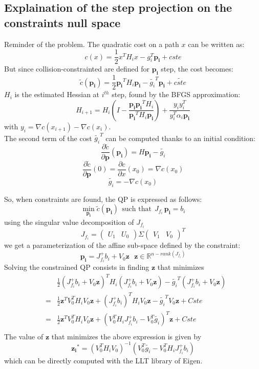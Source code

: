 \documentclass {article}
\newcommand\p{\mathbf{p_i}}
\newcommand\giT{\tilde{g_i}^T}
\newcommand\gi{\tilde{g_i}}
\newcommand\Jfi{J_{f_i}}
\newcommand\real{\mathbb{R}}
\begin{document}
\subsection{Explaination of the step projection on the constraints null space} 
\label{section:lagoLLTSection}
Reminder of the problem. 
The quadratic cost on a path $x$ can be written as:
$$
c(x) = \frac{1}{2}x^T H_i x - g_i^T\p + cste
$$
But since collision-constrainted are defined for $\p$ step, the cost becomes:
$$
\tilde{c}(\p)  = \frac{1}{2}\p^T H_i \p - \giT \p + \tilde{cste}
$$
$H_i$ is the estimated Hessian at $i^{th}$ step, found by the BFGS approximation:
$$ H_{i+1} = H_i(I - \frac{\p\p^T H_i}{\p^T H_i \p}) + \frac{y_i y_i^T}{y_i^T 
\alpha_i\p}$$
with $ y_i = \nabla c(x_{i+1}) - \nabla c(x_i) $.\\
The second term of the cost $ \giT $ can be computed thanks to an initial 
condition:
$$
\frac{\partial\tilde{c}}{\partial \mathbf{p}}(\p) = H\p-\gi
$$
$$
\frac{\partial\tilde{c}}{\partial \mathbf{p}}(0) = \frac{\partial c}
{\partial x}(x_0) = \nabla c(x_0)
$$
$$
\gi = -\nabla c(x_0)
$$

\vspace{0.4cm}

So, when constraints are found, the QP is expressed as follows:
$$
\min_{\p} \tilde{c}(\p) \ \ \mbox{such that}\ \ \Jfi\,\p=b_i
$$
using the singular value decomposition of $\Jfi$
$$
\Jfi = \left(\begin{array}{cc}U_1 & U_0\end{array}\right) \Sigma
\left(\begin{array}{cc}V_1 & V_0\end{array}\right)^T
$$
we get a parameterization of the affine sub-space defined by the constraint:
$$
\p = \Jfi^{+}b_i + V_0\mathbf{z}\ \ \ \mathbf{z}\in\real^{n-rank(\Jfi)}
$$
Solving the constrained QP consists in finding $\mathbf{z}$ that minimizes
\begin{eqnarray*}
&&\frac{1}{2}( \Jfi^{+}b_i + V_0\mathbf{z})^TH_i( \Jfi^{+}b_i + V_0\mathbf{z}) - 
\giT( \Jfi^{+}b_i + V_0\mathbf{z})\\
&=& \frac{1}{2}\mathbf{z}^TV_0^TH_iV_0\mathbf{z} + {(\Jfi^{+}b_i)}^T H_i V_0
\mathbf{z} - \giT V_0\mathbf{z} + Cste \\
&=& \frac{1}{2}\mathbf{z}^TV_0^TH_iV_0\mathbf{z} + (V_0^T H_i \Jfi^{+}b_i  - 
V_0^T\gi)^T\mathbf{z} + Cste \\
\end{eqnarray*}
The value of $\mathbf{z}$ that minimizes the above expression is given by
$$
\mathbf{z_i}^{*} = (V_0^TH_iV_0)^{-1}(V_0^T\gi  - V_0^T H_i \Jfi^{+}b_i)
$$
which can be directly computed with the LLT library of Eigen.
\end{document}
